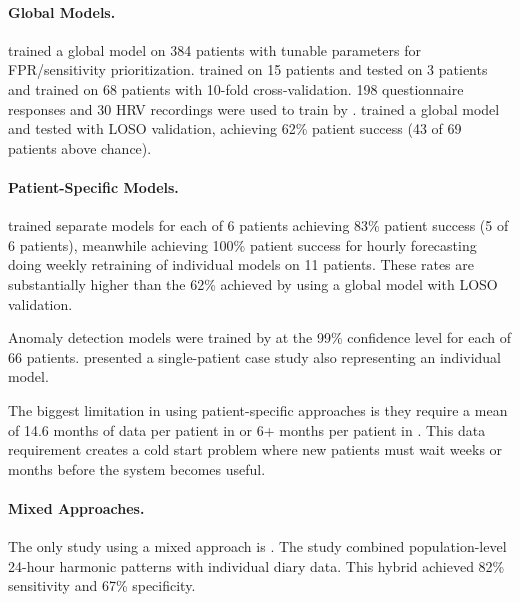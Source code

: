 \paragraph{Global Models.}
\textcite{spahrDeepLearningbasedDetection2025} trained a global model on 384 patients with tunable parameters for FPR/sensitivity prioritization. 
\textcite{fineDetectionKeyAutomated2025} trained on 15 patients and tested on 3 patients and \textcite{dongTwoLayerEnsembleMethod2022} trained on 68 patients with 10-fold cross-validation. 
198 questionnaire responses and 30 HRV recordings were used to train by \textcite{elemamAutomatedValidatedTool2025}. \textcite{meiselMachineLearningWristband2020} trained a global model and tested with LOSO validation, achieving 62\% patient success (43 of 69 patients above chance).


\paragraph{Patient-Specific Models.}
\textcite{nasseriAmbulatorySeizureForecasting2021} trained separate models for each of 6 patients achieving 83\% patient success (5 of 6 patients), meanwhile achieving 100\% patient success for hourly forecasting \textcite{stirlingForecastingSeizureLikelihood2021} doing weekly retraining of individual models on 11 patients. These rates are substantially higher than the 62\% achieved by \textcite{meiselMachineLearningWristband2020} using a global model with LOSO validation.

Anomaly detection models were trained by \textcite{odeDevelopmentEpilepticSeizure2023}  at the 99\% confidence level for each of 66 patients. \textcite{singhrathoreDevelopmentMultimodalMachine2024} presented a single-patient case study also representing an individual model.

The biggest limitation in using patient-specific approaches is they require a mean of 14.6 months of data per patient in \textcite{stirlingForecastingSeizureLikelihood2021} or 6+ months per patient in \textcite{nasseriAmbulatorySeizureForecasting2021}. This data requirement creates a cold start problem where new patients must wait weeks or months before the system becomes useful.

\paragraph{Mixed Approaches.}
The only study using a mixed approach is \textcite{vielufSeizureMonitoringCombined2025}. The study combined population-level 24-hour harmonic patterns with individual diary data. This hybrid achieved 82\% sensitivity and 67\% specificity.

